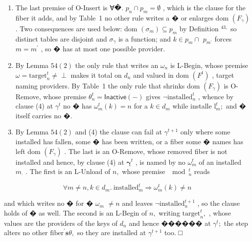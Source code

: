 \documentclass[
  10
]{article}
\begin{document}
\begin{enumerate}
\def\labelenumi{(\arabic{enumi})}
\setcounter{enumi}{1}
\item
  The last premise of O-Insert is ∀�.
  \(p _ { n } \cap p _ { m } = \emptyset\) , which is the clause for the
  fiber it adds, and by Table~1 no other rule writes a � or enlarges dom
  \(\left( F _ { \gamma } \right)\) . Two consequences are used below:
  dom \(( \sigma _ { m } ) \subseteq p _ { m }\) by Definition
  \(^ { 4 3 , }\) so distinct tables are disjoint and
  \(\sigma _ { \gamma }\) is a function; and \(k \in p _ { m } \cap\)
  \(p _ { m ^ { \prime } }\) forces \(m = m ^ { \prime }\) , so � has at
  most one possible provider.
\item
  By Lemma \(5 4 ( 2 )\) the only rule that writes an \(\omega _ { n }\)
  is L-Begin, whose premise
  \(\omega = \mathrm { t a r g e t } _ { n } ^ { t } \neq \perp\) makes
  it total on \(d _ { n }\) and valued in dom
  \(\left( F ^ { t } \right)\) , target naming providers. By Table~1 the
  only rule that shrinks dom \(\left( F _ { \gamma } \right)\) is
  O-Remove, whose premise
  \(\theta _ { n } ^ { t } = \mathsf { I n a c t i v e } ( - )\) gives
  \(\lnot \mathrm { i n s t a l l e d } _ { n } ^ { t }\) , whence by
  clause (4) at \(\gamma ^ { t }\) no � has
  \(\omega _ { m } ^ { t } ( k ) = n\) for a \(k \in d _ { m }\) while
  installe \(\mathrm { l } _ { m } ^ { t } ;\) and � itself carries no
  �.
\item
  By Lemma \(5 4 ( 2 )\) and (4) the clause can fail at
  \(\gamma ^ { t + 1 }\) only where some installed has fallen, some �
  has been written, or a fiber some � names has left dom
  \(\left( F _ { \gamma } \right)\) . The last is an O-Remove, whose
  removed fiber is not installed and hence, by clause (4) at
  \(\boldsymbol { \gamma } ^ { t }\) , is named by no
  \(\omega _ { m } ^ { t }\) of an installed \(m _ { \cdot }\) . The
  first is an L-Unload of \(n ,\) whose premise \(\mod _ { n } ^ { t }\)
  reads
\end{enumerate}

\[
\forall m \neq n , k \in d _ { m } . { \mathrm { ~ i n s t a l l e d } } _ { m } ^ { t } \Rightarrow \omega _ { m } ^ { t } ( k ) \neq n
\]

and which writes no � for � \(\omega _ { m }\) \(\neq n\) and leaves
\(\neg { \mathrm { i n s t a l l e d } } _ { n } ^ { t + 1 }\) , so the
clause holds of � as well. The second is an L-Begin of \(n ,\) writing
\(\mathrm { t a r g e t } _ { n } ^ { t } ,\) , whose values are the
providers of the keys of \(d _ { n }\) and hence ������ at
\(\gamma ^ { t } ;\) the step alters no other
\({ \mathrm { f i b e r } } ^ { \prime } \mathbf { s } \theta ,\) so
they are installed at \(\gamma ^ { t + 1 }\) too. □
\end{document}
